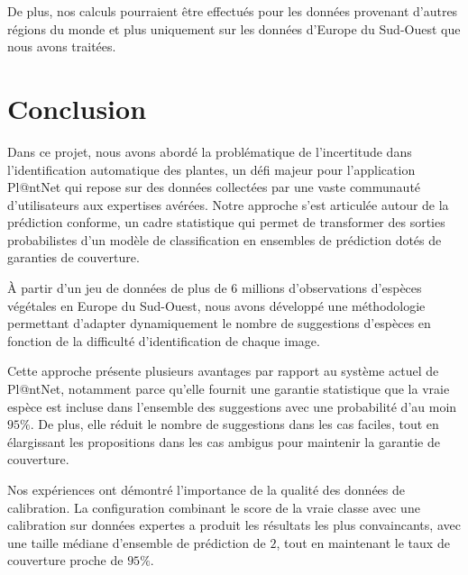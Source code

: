 \documentclass[a4paper,12pt]{article}
\begin{document}
\vspace{0.2cm}

De plus, nos calculs pourraient être effectués pour les données provenant d'autres régions du monde et plus uniquement sur les données d'Europe du Sud-Ouest que nous avons traitées.


\section{Conclusion}

Dans ce projet, nous avons abordé la problématique de l'incertitude dans l'identification automatique des plantes, un défi majeur pour l'application Pl@ntNet qui repose sur des données collectées par une vaste communauté d'utilisateurs aux expertises avérées. Notre approche s'est articulée autour de la prédiction conforme, un cadre statistique qui permet de transformer des sorties probabilistes d'un modèle de classification en ensembles de prédiction dotés de garanties de couverture.

\vspace{0.2cm}

À partir d'un jeu de données de plus de $6$ millions d'observations d'espèces végétales en Europe du Sud-Ouest, nous avons développé une méthodologie permettant d'adapter dynamiquement le nombre de suggestions d'espèces en fonction de la difficulté d'identification de chaque image. 

\vspace{0.2cm}

Cette approche présente plusieurs avantages par rapport au système actuel de Pl@ntNet, notamment parce qu'elle fournit une garantie statistique que la vraie espèce est incluse dans l'ensemble des suggestions avec une probabilité d'au moin $95\%$. De plus, elle réduit le nombre de suggestions dans les cas faciles, tout en élargissant les propositions dans les cas ambigus pour maintenir la garantie de couverture.

\vspace{0.2cm}

Nos expériences ont démontré l'importance de la qualité des données de calibration. La configuration combinant le score de la vraie classe avec une calibration sur données expertes a produit les résultats les plus convaincants, avec une taille médiane d'ensemble de prédiction de $2$, tout en maintenant le taux de couverture proche de $95\%$.
\end{document}
